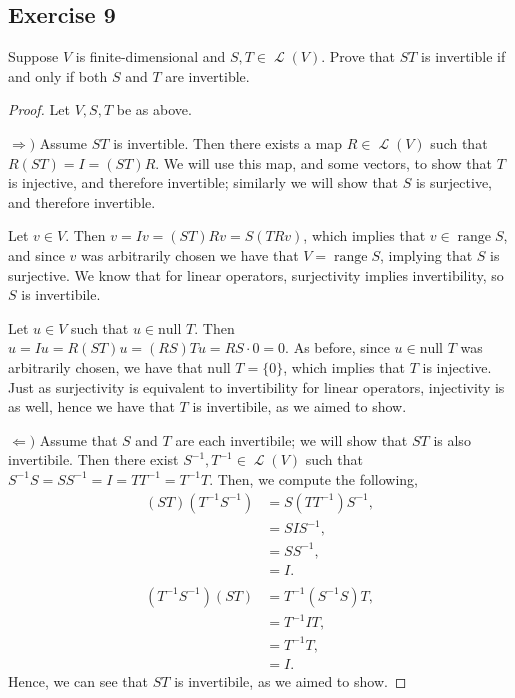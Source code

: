 \documentclass[letterpaper, 12pt]{amsart}
\renewcommand{\null}{\text{null }}
\DeclareMathOperator{\range}{\text{range }}
\DeclareMathOperator{\Ell}{\mathscr{L}}
\theoremstyle{definition}  %
\newcommand{\Ra}{\Rightarrow}                   %
\newcommand{\La}{\Leftarrow}                    %
\begin{document}
		\subsection*{Exercise 9}
		Suppose $V$ is finite-dimensional and $S,T \in \Ell(V)$. 
		Prove that $ST$ is invertible if and only if both $S$ and $T$ are invertible.
		
		\begin{proof}
		Let $V, S, T$ be as above.

		$\Ra)$ Assume $ST$ is invertible.
		Then there exists a map $R \in \Ell(V)$ such that $R(ST) = I = (ST)R$.
		We will use this map, and some vectors, to show that $T$ is injective, and therefore invertible; similarly we will show that $S$ is surjective, and therefore invertible.

		Let $v \in V$.
		Then $v = Iv = (ST)Rv = S(TRv)$, which implies that $v \in \range S$, and since $v$ was arbitrarily chosen we have that $V = \range S$, implying that $S$ is surjective.
		We know that for linear operators, surjectivity implies invertibility, so $S$ is invertibile.

		Let $u \in V$ such that $u \in \null T$.
		Then $u = Iu = R(ST)u = (RS)Tu = RS \cdot 0 = 0$.
		As before, since $u \in \null T$ was arbitrarily chosen, we have that $\null T = \{0\}$, which implies that $T$ is injective.
		Just as surjectivity is equivalent to invertibility for linear operators, injectivity is as well, hence we have that $T$ is invertibile, as we aimed to show.

		$\La)$ Assume that $S$ and $T$ are each invertibile; we will show that $ST$ is also invertibile.
		Then there exist $S^{-1}, T^{-1} \in \Ell(V)$ such that $S^{-1}S = SS^{-1} = I = TT^{-1} = T^{-1}T$.
		Then, we compute the following,
			\begin{align*}
				(ST)(T^{-1}S^{-1}) &= S(TT^{-1})S^{-1}, \\
				&= SIS^{-1}, \\
				&= SS^{-1}, \\
				&= I. \\
				\\
				(T^{-1}S^{-1})(ST) &= T^{-1}(S^{-1}S)T, \\
				&= T^{-1}IT, \\
				&= T^{-1}T, \\
				&= I.
			\end{align*}
		Hence, we can see that $ST$ is invertibile, as we aimed to show.			
		\end{proof}
\end{document}
